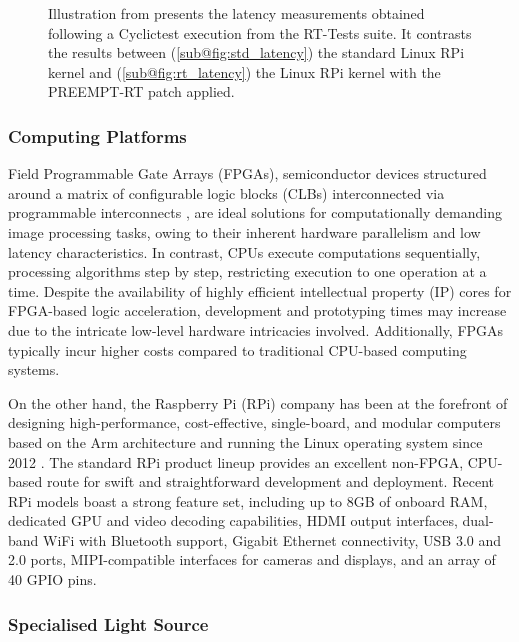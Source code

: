 \begin{figure}[H]
\begin{subfigure}{.49\textwidth}
        \caption{}
        \label{fig:rt_latency}
    \end{subfigure}
    \caption{Illustration from \cite{maurorivaRaspberryPi4B2019} presents the latency measurements obtained following a Cyclictest execution from the RT-Tests suite. It contrasts the results between (\ref{sub@fig:std_latency}) the standard Linux RPi kernel and (\ref{sub@fig:rt_latency}) the Linux RPi kernel with the PREEMPT-RT patch applied.}
    \label{fig:lemariva_latency}
\end{figure}

\subsubsection{Computing Platforms}
Field Programmable Gate Arrays (FPGAs), semiconductor devices structured around a matrix of configurable logic blocks (CLBs) interconnected via programmable interconnects \cite{WhatFPGAField}, are ideal solutions for computationally demanding image processing tasks, owing to their inherent hardware parallelism and low latency characteristics. In contrast, CPUs execute computations sequentially, processing algorithms step by step, restricting execution to one operation at a time. Despite the availability of highly efficient intellectual property (IP) cores for FPGA-based logic acceleration, development and prototyping times may increase due to the intricate low-level hardware intricacies involved. Additionally, FPGAs typically incur higher costs compared to traditional CPU-based computing systems.

On the other hand, the Raspberry Pi (RPi) company has been at the forefront of designing high-performance, cost-effective, single-board, and modular computers based on the Arm architecture and running the Linux operating system since 2012 \cite{raspberrypiltdRaspberryPiUs}. The standard RPi product lineup provides an excellent non-FPGA, CPU-based route for swift and straightforward development and deployment. Recent RPi models boast a strong feature set, including up to 8GB of onboard RAM, dedicated GPU and video decoding capabilities, HDMI output interfaces, dual-band WiFi with Bluetooth support, Gigabit Ethernet connectivity, USB 3.0 and 2.0 ports, MIPI-compatible interfaces for cameras and displays, and an array of 40 GPIO pins.

\subsubsection{Specialised Light Source}

